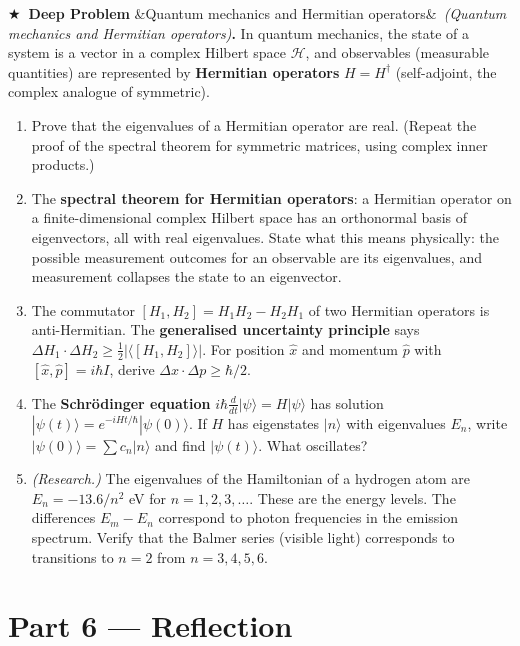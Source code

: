 \documentclass[12pt, a4paper]{article}
\newcounter{problem}
\newcounter{deepproblem}
\newenvironment{deepproblem}[1][]{\refstepcounter{deepproblem}\par\vspace{6pt}\noindent\textbf{\color{NavyBlue}$\bigstar$\ Deep Problem \thedeepproblem}\ifx&#1&\else\ \textit{(#1)}\fi\textbf{.}\enskip}{\par\vspace{4pt}}
\begin{document}
\begin{deepproblem}[Quantum mechanics and Hermitian operators]
In quantum mechanics, the state of a system is a vector in a complex Hilbert space $\mathcal{H}$, and observables (measurable quantities) are represented by \textbf{Hermitian operators} $H = H^\dagger$ (self-adjoint, the complex analogue of symmetric).
\begin{enumerate}[label=(\alph*)]
  \item Prove that the eigenvalues of a Hermitian operator are real. (Repeat the proof of the spectral theorem for symmetric matrices, using complex inner products.)
  \item The \textbf{spectral theorem for Hermitian operators}: a Hermitian operator on a finite-dimensional complex Hilbert space has an orthonormal basis of eigenvectors, all with real eigenvalues. State what this means physically: the possible measurement outcomes for an observable are its eigenvalues, and measurement collapses the state to an eigenvector.
  \item The commutator $[H_1, H_2] = H_1 H_2 - H_2 H_1$ of two Hermitian operators is anti-Hermitian. The \textbf{generalised uncertainty principle} says $\Delta H_1 \cdot \Delta H_2 \geq \frac{1}{2}|\langle[H_1,H_2]\rangle|$. For position $\hat{x}$ and momentum $\hat{p}$ with $[\hat{x},\hat{p}] = i\hbar I$, derive $\Delta x \cdot \Delta p \geq \hbar/2$.
  \item The \textbf{Schr\"odinger equation} $i\hbar\frac{d}{dt}|\psi\rangle = H|\psi\rangle$ has solution $|\psi(t)\rangle = e^{-iHt/\hbar}|\psi(0)\rangle$. If $H$ has eigenstates $|n\rangle$ with eigenvalues $E_n$, write $|\psi(0)\rangle = \sum c_n|n\rangle$ and find $|\psi(t)\rangle$. What oscillates?
  \item \textit{(Research.)} The eigenvalues of the Hamiltonian of a hydrogen atom are $E_n = -13.6/n^2$ eV for $n = 1, 2, 3, \ldots$. These are the energy levels. The differences $E_m - E_n$ correspond to photon frequencies in the emission spectrum. Verify that the Balmer series (visible light) corresponds to transitions to $n=2$ from $n=3,4,5,6$.
\end{enumerate}
\end{deepproblem}

\section{Part 6 \texorpdfstring{---}{--} Reflection}
\end{document}
